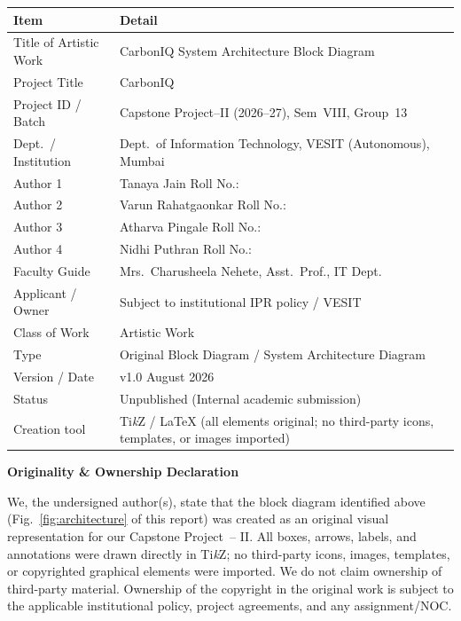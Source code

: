 ﻿\documentclass[conference]{IEEEtran}
\begin{document}
\vspace{6pt}
\noindent\begin{tabular}{@{}p{3.8cm}p{8.5cm}@{}}
\toprule
\textbf{Item} & \textbf{Detail}\\
\midrule
Title of Artistic Work & CarbonIQ System Architecture Block Diagram\\
Project Title & CarbonIQ\\
Project ID / Batch & Capstone Project--II (2026--27), Sem~VIII, Group~13\\
Dept.\ / Institution & Dept.\ of Information Technology, VESIT (Autonomous), Mumbai\\
\midrule
Author 1 & Tanaya Jain \quad Roll No.: \underline{\hspace{2.5cm}}\\
Author 2 & Varun Rahatgaonkar \quad Roll No.: \underline{\hspace{2.5cm}}\\
Author 3 & Atharva Pingale \quad Roll No.: \underline{\hspace{2.5cm}}\\
Author 4 & Nidhi Puthran \quad Roll No.: \underline{\hspace{2.5cm}}\\
Faculty Guide & Mrs.\ Charusheela Nehete, Asst.\ Prof., IT Dept.\\
\midrule
Applicant / Owner & Subject to institutional IPR policy / VESIT\\
Class of Work & Artistic Work\\
Type & Original Block Diagram / System Architecture Diagram\\
Version / Date & v1.0 \quad August 2026\\
Status & Unpublished (Internal academic submission)\\
Creation tool & Ti\textit{k}Z / \LaTeX{} (all elements original; no third-party icons,
templates, or images imported)\\
\bottomrule
\end{tabular}

\vspace{12pt}
\noindent\textbf{Originality \& Ownership Declaration}

\noindent We, the undersigned author(s), state that the block diagram identified
above (Fig.~\ref{fig:architecture} of this report) was created as an original visual
representation for our Capstone Project~-- II.
All boxes, arrows, labels, and annotations were drawn directly in Ti\textit{k}Z;
no third-party icons, images, templates, or copyrighted graphical elements were
imported.
We do not claim ownership of third-party material.
Ownership of the copyright in the original work is subject to the applicable
institutional policy, project agreements, and any assignment/NOC.
\end{document}
